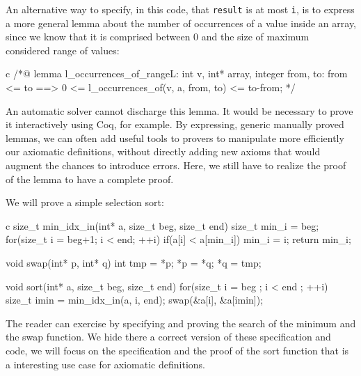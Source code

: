 \documentclass[middle]{zmdocument}
\begin{document}
An alternative way to specify, in this code, that \texttt{result} is at
most \texttt{i}, is to express a more general lemma about the number of
occurrences of a value inside an array, since we know that it is
comprised between 0 and the size of maximum considered range of values:



\begin{CodeBlock}{c}
/*@
lemma l_occurrences_of_range{L}:
  \forall int v, int* array, integer from, to:
    from <= to ==> 0 <= l_occurrences_of(v, a, from, to) <= to-from;
*/
\end{CodeBlock}



An automatic solver cannot discharge this lemma. It would be necessary
to prove it interactively using Coq, for example. By expressing, generic
manually proved lemmas, we can often add useful tools to provers to
manipulate more efficiently our axiomatic definitions, without directly
adding new axioms that would augment the chances to introduce errors.
Here, we still have to realize the proof of the lemma to have a complete
proof.





We will prove a simple selection sort:



\begin{CodeBlock}{c}
size_t min_idx_in(int* a, size_t beg, size_t end){
  size_t min_i = beg;
  for(size_t i = beg+1; i < end; ++i)
    if(a[i] < a[min_i]) min_i = i;
  return min_i;
}

void swap(int* p, int* q){
  int tmp = *p; *p = *q; *q = tmp;
}

void sort(int* a, size_t beg, size_t end){
  for(size_t i = beg ; i < end ; ++i){
    size_t imin = min_idx_in(a, i, end);
    swap(&a[i], &a[imin]);
  }
}
\end{CodeBlock}



The reader can exercise by specifying and proving the search of the
minimum and the swap function. We hide there a correct version of these
specification and code, we will focus on the specification and the proof
of the sort function that is a interesting use case for axiomatic
definitions.
\end{document}
